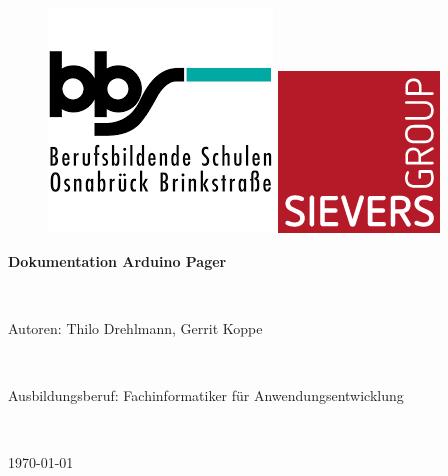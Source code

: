 \documentclass[a4paper, 11pt]{scrartcl}
\begin{document}
\thispagestyle{empty}
\vspace{0.2\textheight}
\begin{center}
    \begin{figure}[H]
        \begin{minipage}{0.3\textwidth}
            \includegraphics[scale=0.6]{Bilder/BBS}
        \end{minipage}
        \hspace{0.48\textwidth}
        \begin{minipage}{0.3\textwidth}
            \includegraphics[scale=0.6]{Bilder/sievers.png}
        \end{minipage}
    \end{figure}
    \vspace{1cm}
    \begin{Huge}
        \textcolor{BBS}{\textbf{Dokumentation Arduino Pager}} 
    \end{Huge}
    \\
    \vspace{0.1\textheight}
    \begin{Large}
        Autoren: Thilo Drehlmann, Gerrit Koppe
    \end{Large}
    \\
    \vspace{0.5cm}
    \begin{Large}
        Ausbildungsberuf: Fachinformatiker für Anwendungsentwicklung
    \end{Large}
    \\
    \vspace{0.5cm}
    \begin{Large}
        \today
    \end{Large}
\end{center}
\end{document}
